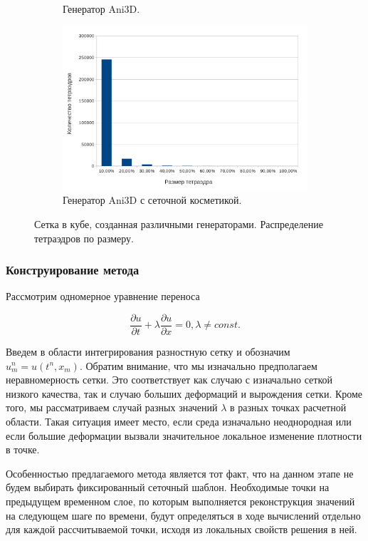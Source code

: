 \begin{figure}[htp]
\begin{subfigure}[b]{0.5\textwidth}
\caption{Генератор Ani3D.}
\end{subfigure}
\begin{subfigure}[b]{0.5\textwidth}
\centering
\includegraphics[width=\textwidth]{png/ani3d-improved-stats.png}
\caption{Генератор Ani3D с сеточной косметикой.}
\end{subfigure}
\caption{Сетка в кубе, созданная различными генераторами. Распределение тетраэдров по размеру.}
\label{pic:mesh_quality}
\end{figure}

\clearpage
\newpage

\subsubsection{Конструирование метода}

Рассмотрим одномерное уравнение переноса

\begin{equation}
\frac{\partial{u}}{\partial{t}} + \lambda \frac{\partial{u}}{\partial{x}} = 0, \lambda \ne const.
\end{equation}

Введем в области интегрирования разностную сетку и обозначим $u_m^n = u(t^n, x_m)$. Обратим внимание, что мы изначально предполагаем неравномерность сетки. Это соответствует как случаю с изначально сеткой низкого качества, так и случаю больших деформаций и вырождения сетки. Кроме того, мы рассматриваем случай разных значений $\lambda$ в разных точках расчетной области. Такая ситуация имеет место, если среда изначально неоднородная или если большие деформации вызвали значительное локальное изменение плотности в точке.

Особенностью предлагаемого метода является тот факт, что на данном этапе не будем выбирать фиксированный сеточный шаблон. Необходимые точки на предыдущем временном слое, по которым выполняется реконструкция значений на следующем шаге по времени, будут определяться в ходе вычислений отдельно для каждой рассчитываемой точки, исходя из локальных свойств решения в ней.

